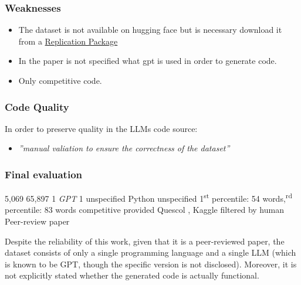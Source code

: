 \subsubsection*{Weaknesses}
\begin{itemize}
    \item The dataset is not available on hugging face but is necessary
    download it from a 
    \href{{https://figshare.com/articles/dataset/Replication_Package/24298036?file=42649573}}{Replication Package}
    \item In the paper is not specified what gpt is used in order to generate code.
    \item Only competitive code.
\end{itemize}


\subsubsection*{Code Quality}
In order to preserve quality in the LLMs code source:
\begin{itemize}
    \item \textit{”manual valiation to ensure the correctness of the dataset”}
\end{itemize}


\subsubsection*{Final evaluation}


\expandafter\def\csname Pan-et-alHumanCode\endcsname{5,069}
\expandafter\def\csname Pan-et-alLLMCode\endcsname{65,897}
\expandafter\def\csname Pan-et-alNumLLMs\endcsname{1 \textit{GPT}}
\expandafter\def\csname Pan-et-alLLMDiversity\endcsname{1}
\expandafter\def\csname Pan-et-alCurrentUse\endcsname{unspecified}
\expandafter\def\csname Pan-et-alLanguages\endcsname{Python}
\expandafter\def\csname Pan-et-alCodeTypes\endcsname{unspecified}
\expandafter\def\csname Pan-et-alCodeSize\endcsname{1\textsuperscript{st} percentile: 54 words,\textsuperscript{rd} percentile: 83 words}
\expandafter\def\csname Pan-et-alCodeContext\endcsname{competitive}
\expandafter\def\csname Pan-et-alPrompts\endcsname{provided}
\expandafter\def\csname Pan-et-alSources\endcsname{ Quescol \cite{quescol2023}, Kaggle \cite{wikipediaKaggle2023}}
\expandafter\def\csname Pan-et-alCodeQuality\endcsname{filtered by human}
\expandafter\def\csname Pan-et-alReliability\endcsname{Peer-review paper}


Despite the reliability of this work, given that it is a peer-reviewed paper, 
the dataset consists of only a single programming language and a single LLM 
(which is known to be GPT, though the specific version is not disclosed). 
Moreover, it is not explicitly stated whether the generated code is actually 
functional.

